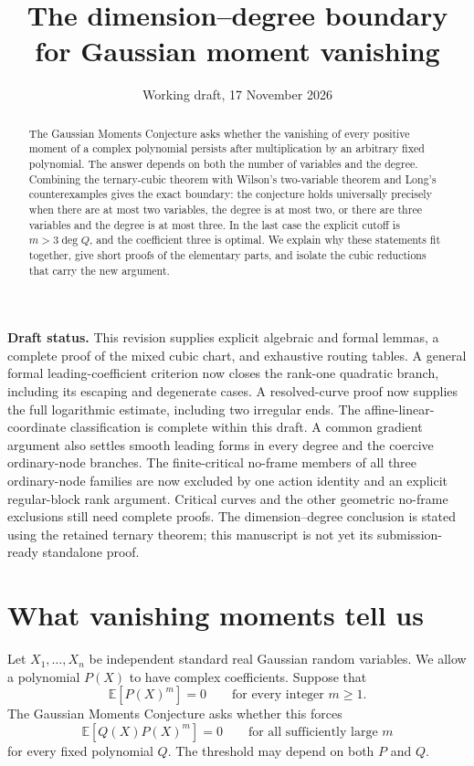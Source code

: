 \documentclass[11pt]{article}
\title{The dimension--degree boundary\\for Gaussian moment vanishing}
\author{}
\date{Working draft, 17 November 2026}
\theoremstyle{definition}\newtheorem{definition}[theorem]{Definition}
\theoremstyle{remark}\newtheorem{remark}[theorem]{Remark}
\newcommand{\E}{\mathbb E}
\begin{document}
\maketitle
\begin{center}\begin{minipage}{0.91\textwidth}\small
\textbf{Draft status.} This revision supplies explicit algebraic and formal
lemmas, a complete proof of the mixed cubic chart, and exhaustive routing
tables. A general formal leading-coefficient criterion now closes the
rank-one quadratic branch, including its escaping and degenerate cases.
A resolved-curve proof now supplies the full logarithmic estimate,
including two irregular ends. The affine-linear-coordinate classification
is complete within this draft. A common gradient argument also settles
smooth leading forms in every degree and the coercive ordinary-node
branches. The finite-critical no-frame members of all three ordinary-node
families are now excluded by one action identity and an explicit
regular-block rank argument. Critical curves and the other geometric
no-frame exclusions still need
complete proofs. The
dimension--degree conclusion is stated using the retained ternary theorem;
this manuscript is not yet its submission-ready standalone proof.
\end{minipage}\end{center}

\begin{abstract}
The Gaussian Moments Conjecture asks whether the vanishing of every
positive moment of a complex polynomial persists after multiplication by
an arbitrary fixed polynomial. The answer depends on both the number of
variables and the degree. Combining the ternary-cubic theorem with
Wilson's two-variable theorem and Long's counterexamples gives the exact
boundary: the conjecture holds universally precisely when there are at
most two variables, the degree is at most two, or there are three variables
and the degree is at most three. In the last case the explicit cutoff is
$m>3\deg Q$, and the coefficient three is optimal. We explain why these
statements fit together, give short proofs of the elementary parts, and
isolate the cubic reductions that carry the new argument.
\end{abstract}

\section{What vanishing moments tell us}

Let $X_1,\ldots,X_n$ be independent standard real Gaussian random
variables. We allow a polynomial $P(X)$ to have complex coefficients.
Suppose that
\begin{equation}\label{eq:pure}
  \E[P(X)^m]=0\qquad\text{for every integer }m\geq1.
\end{equation}
The Gaussian Moments Conjecture asks whether this forces
\begin{equation}\label{eq:safe}
  \E[Q(X)P(X)^m]=0\qquad\text{for all sufficiently large }m
\end{equation}
for every fixed polynomial $Q$. The threshold may depend on both $P$
and $Q$.
\end{document}
